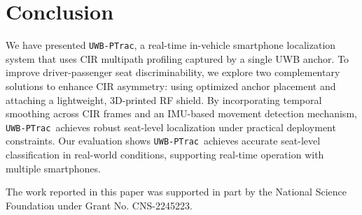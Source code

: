 \documentclass[sigconf]{acmart}
\newcommand{\name}{{{\tt UWB-PTrac}}}
\begin{document}

\vspace{-0.05in}
\section{Conclusion} 

We have presented \name, a real-time in-vehicle smartphone localization system that uses CIR multipath profiling captured by a single UWB anchor. To improve driver-passenger seat discriminability, we explore two complementary solutions to enhance CIR asymmetry: using optimized anchor placement and attaching a lightweight, 3D-printed RF shield. By incorporating temporal smoothing across CIR frames and an IMU-based movement detection mechanism, \name\ achieves robust seat-level localization under practical deployment constraints. Our evaluation shows \name\ achieves accurate seat-level classification in real-world conditions, supporting real-time operation with multiple smartphones.
\begin{acks}
The work reported in this paper was supported in part by the National Science Foundation under Grant No. CNS-2245223.
\end{acks}
\vfill


\end{document}
